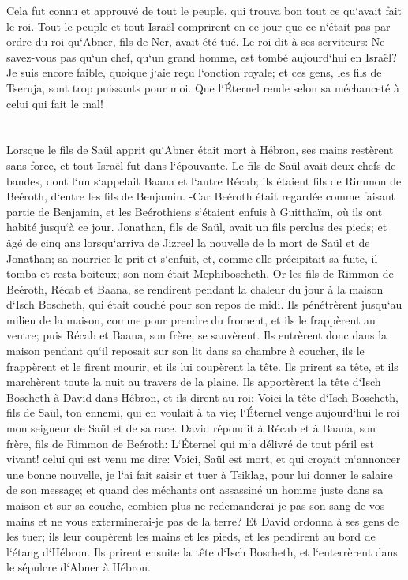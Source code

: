 \verse Cela fut connu et approuvé de tout le peuple, qui trouva bon tout ce qu`avait fait le roi. 
\verse Tout le peuple et tout Israël comprirent en ce jour que ce n`était pas par ordre du roi qu`Abner, fils de Ner, avait été tué. 
\verse Le roi dit à ses serviteurs: Ne savez-vous pas qu`un chef, qu`un grand homme, est tombé aujourd`hui en Israël? 
\verse Je suis encore faible, quoique j`aie reçu l`onction royale; et ces gens, les fils de Tseruja, sont trop puissants pour moi. Que l`Éternel rende selon sa méchanceté à celui qui fait le mal! 

\chapter{}

\verse Lorsque le fils de Saül apprit qu`Abner était mort à Hébron, ses mains restèrent sans force, et tout Israël fut dans l`épouvante. 
\verse Le fils de Saül avait deux chefs de bandes, dont l`un s`appelait Baana et l`autre Récab; ils étaient fils de Rimmon de Beéroth, d`entre les fils de Benjamin. -Car Beéroth était regardée comme faisant partie de Benjamin, 
\verse et les Beérothiens s`étaient enfuis à Guitthaïm, où ils ont habité jusqu`à ce jour. 
\verse Jonathan, fils de Saül, avait un fils perclus des pieds; et âgé de cinq ans lorsqu`arriva de Jizreel la nouvelle de la mort de Saül et de Jonathan; sa nourrice le prit et s`enfuit, et, comme elle précipitait sa fuite, il tomba et resta boiteux; son nom était Mephiboscheth. 
\verse Or les fils de Rimmon de Beéroth, Récab et Baana, se rendirent pendant la chaleur du jour à la maison d`Isch Boscheth, qui était couché pour son repos de midi. 
\verse Ils pénétrèrent jusqu`au milieu de la maison, comme pour prendre du froment, et ils le frappèrent au ventre; puis Récab et Baana, son frère, se sauvèrent. 
\verse Ils entrèrent donc dans la maison pendant qu`il reposait sur son lit dans sa chambre à coucher, ils le frappèrent et le firent mourir, et ils lui coupèrent la tête. Ils prirent sa tête, et ils marchèrent toute la nuit au travers de la plaine. 
\verse Ils apportèrent la tête d`Isch Boscheth à David dans Hébron, et ils dirent au roi: Voici la tête d`Isch Boscheth, fils de Saül, ton ennemi, qui en voulait à ta vie; l`Éternel venge aujourd`hui le roi mon seigneur de Saül et de sa race. 
\verse David répondit à Récab et à Baana, son frère, fils de Rimmon de Beéroth: L`Éternel qui m`a délivré de tout péril est vivant! 
\verse celui qui est venu me dire: Voici, Saül est mort, et qui croyait m`annoncer une bonne nouvelle, je l`ai fait saisir et tuer à Tsiklag, pour lui donner le salaire de son message; 
\verse et quand des méchants ont assassiné un homme juste dans sa maison et sur sa couche, combien plus ne redemanderai-je pas son sang de vos mains et ne vous exterminerai-je pas de la terre? 
\verse Et David ordonna à ses gens de les tuer; ils leur coupèrent les mains et les pieds, et les pendirent au bord de l`étang d`Hébron. Ils prirent ensuite la tête d`Isch Boscheth, et l`enterrèrent dans le sépulcre d`Abner à Hébron. 

